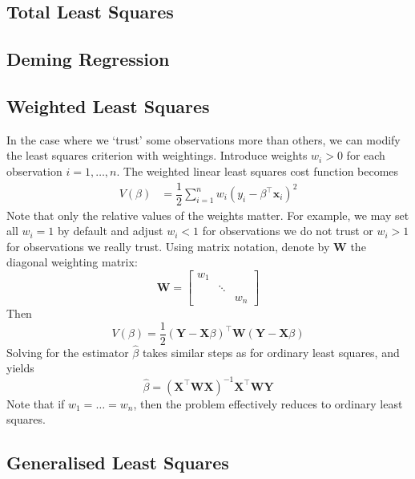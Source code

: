 \documentclass[11pt]{report} %
\begin{document}
\subsection{Total Least Squares}

\subsection{Deming Regression}

\subsection{Weighted Least Squares}

In the case where we `trust' some observations more than others, we can modify the least squares criterion with weightings. Introduce weights $w_{i} > 0$ for each observation $i = 1, \dots, n$. The weighted linear least squares cost function becomes
\begin{align}
V\left(\beta\right) &= \dfrac{1}{2}\sum_{i = 1}^{n}w_{i}\left(y_{i} - \beta^{\top}\mathbf{x}_{i}\right)^{2}
\end{align}
Note that only the relative values of the weights matter. For example, we may set all $w_{i} = 1$ by default and adjust $w_{i} < 1$ for observations we do not trust or $w_{i} > 1$ for observations we really trust. Using matrix notation, denote by $\mathbf{W}$ the diagonal weighting matrix:
\begin{equation}
\mathbf{W} = \begin{bmatrix}
w_{1} & & \\ & \ddots & \\ & & w_{n}
\end{bmatrix}
\end{equation}
Then
\begin{equation}
V\left(\beta\right) = \dfrac{1}{2}\left(\mathbf{Y} - \mathbf{X}\beta\right)^{\top}\mathbf{W}\left(\mathbf{Y} - \mathbf{X}\beta\right)
\end{equation}
Solving for the estimator $\hat{\beta}$ takes similar steps as for ordinary least squares, and yields
\begin{equation}
\hat{\beta} = \left(\mathbf{X}^{\top}\mathbf{W}\mathbf{X}\right)^{-1}\mathbf{X}^{\top}\mathbf{W}\mathbf{Y}
\end{equation}
Note that if $w_{1} = \dots = w_{n}$, then the problem effectively reduces to ordinary least squares.

\subsection{Generalised Least Squares}
\end{document}
